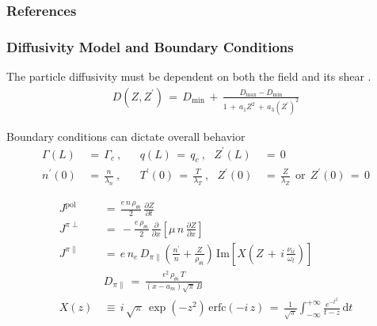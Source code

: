 \documentclass[10pt]{beamer}
\begin{document}

\begin{frame}
\frametitle{References}
\renewcommand*{\bibfont}{\tiny}
\printbibliography
\end{frame}


\appendix

\begin{frame} %
\frametitle{Diffusivity Model and Boundary Conditions}

The particle diffusivity must be dependent on both the field and its shear \parencite{paquay_studying_2012}.
\begin{align} %
	D(Z, Z^{\prime}) \,=\, D_\text{min} \,+\,
		\frac{D_\text{max} - D_\text{min}}{1 \,+\, a_1 Z^2 \,+\,
		a_3 (Z^{\prime})^2} \label{eq:flow_shear_diffusivity}
\end{align}

Boundary conditions can dictate overall behavior
\begin{align} %
	\Gamma(L) \,&=\, \Gamma_c~,~~~ &q(L) \,=\, q_c~,~~~ Z^\prime(L) \,&=\, 0 \\
	n^\prime(0) \,&=\, \frac{n}{\lambda_n}~, ~~~~ &T^\prime(0) \,=\,
	\frac{T}{\lambda_T}~,~~~ Z^\prime(0) \,&=\, \frac{Z}{\lambda_Z} ~~
		\text{or} ~~ Z^\prime(0) \,=\, 0
\end{align}

\end{frame}


\begin{frame} %
\begin{align}
	J^\text{pol} \,&=\, \frac{e \, n \, \rho_{\theta i}}{2} \,
		\frac{\partial Z}{\partial t} \\
	J^{\pi\perp} \,&=\, -\frac{e \, \rho_{\theta i}}{2} \,
		\frac{\partial}{\partial x} \left[\mu \, n \, \frac{\partial Z}
		{\partial x}\right] \\
	J^{\pi\parallel} \,&=\, e\,n_e\,D_{\pi\parallel}
		\left(\frac{n^\prime}{n} + \frac{Z}{\rho_{\theta i}}\right) \,
		\text{Im}\left[X\left(Z \,+\, i\,\frac{\nu_{ii}}{\omega_t}\right)
		\right] \\
	&D_{\pi\parallel} \,=\, \frac{\epsilon^2\,\rho_{\theta i}\,T}
		{(x - a_m)\sqrt{\pi}\,B} \\
		X(z) \,&\equiv\, i\,\sqrt{\pi} \, \exp(-z^2) \, \text{erfc}(-i\,z) \,=\,
		\frac{1}{\sqrt{\pi}} \int_{-\infty}^{+\infty} \frac{e^{-t^2}}{t - z}
		\, \text{d}t
\end{align}
\end{frame}
\end{document}
